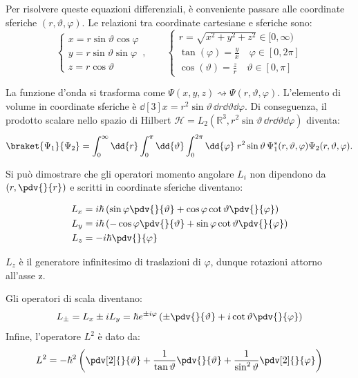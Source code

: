 Per risolvere queste equazioni differenziali, è conveniente passare alle coordinate sferiche \( (r, \vartheta, \varphi) \).
Le relazioni tra coordinate cartesiane e sferiche sono:
\[
\begin{cases}
    x = r \sin\vartheta \cos\varphi \\
    y = r \sin\vartheta \sin\varphi \\
    z = r \cos\vartheta
\end{cases},
\qquad
\begin{cases}
    r = \sqrt{x^2+y^2+z^2} \in [0, \infty) \\
    \tan(\varphi) = \frac{y}{x} \quad \varphi \in [0, 2\pi] \\
    \cos(\vartheta) = \frac{z}{r} \quad \vartheta \in [0, \pi] 
\end{cases}
\]

La funzione d'onda si trasforma come \( \Psi(x,y,z) \rightsquigarrow \Psi(r, \vartheta, \varphi) \).
L'elemento di volume in coordinate sferiche è \( \dd[3]{x} = r^2 \sin\vartheta \, \dd{r} \dd{\vartheta} \dd{\varphi} \).
Di conseguenza, il prodotto scalare nello spazio di Hilbert \( \mathcal{H} = L_2(\mathbb{R}^3, r^2 \sin\vartheta \, \dd{r} \dd{\vartheta} \dd{\varphi}) \) diventa:
\begin{equation}
    \braket{\Psi_1}{\Psi_2} = \int_0^{\infty} \dd{r} \int_0^{\pi} \dd{\vartheta} \int_0^{2\pi} \dd{\varphi} \; r^2 \sin\vartheta \, \Psi_1^*(r, \vartheta, \varphi) \Psi_2(r, \vartheta, \varphi).
\end{equation}
 
Si può dimostrare che gli operatori momento angolare \(L_i\) non dipendono da \(\left( r, \pdv{}{r} \right)\) e scritti in coordinate sferiche diventano:

\begin{align}
    L_x &= i\hbar \left( \sin\varphi \pdv{}{\vartheta} + \cos\varphi \cot\vartheta \pdv{}{\varphi} \right) \\
    L_y &= i\hbar \left( -\cos\varphi \pdv{}{\vartheta} + \sin\varphi \cot\vartheta \pdv{}{\varphi} \right) \\
    L_z &= -i\hbar \pdv{}{\varphi}
\end{align}
\begin{remark}
    \(L_z\) è il generatore infinitesimo di traslazioni di \(\varphi\), dunque rotazioni attorno all'asse z.
\end{remark}
Gli operatori di scala diventano:
\begin{equation}
    L_\pm = L_x \pm i L_y = \hbar e^{\pm i\varphi} \left( \pm \pdv{}{\vartheta} + i \cot\vartheta \pdv{}{\varphi} \right)
\end{equation}
Infine, l'operatore \( L^2 \) è dato da:
\begin{equation}
    L^2 = -\hbar^2 \left( \pdv[2]{}{\vartheta} + \frac{1}{\tan\vartheta} \pdv{}{\vartheta} + \frac{1}{\sin^2\vartheta} \pdv[2]{}{\varphi} \right)
\end{equation}

